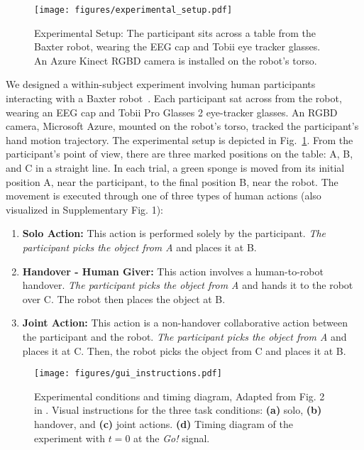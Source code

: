 \begin{figure}[t]
    \centering
    \texttt{[image: figures/experimental\_setup.pdf]}
    \caption{\justifying Experimental Setup: The participant sits across a table from the Baxter robot, wearing the EEG cap and Tobii eye tracker glasses. An Azure Kinect RGBD camera is installed on the robot's torso.}
    \label{fig:experimental setup}
\end{figure}

We designed a within-subject experiment involving human participants interacting with a Baxter robot~\cite{baxter-Doe:2024:Online}. Each participant sat across from the robot, wearing an EEG cap and Tobii Pro Glasses 2 eye-tracker glasses. An RGBD camera, Microsoft Azure,  mounted on the robot's torso, tracked the participant's hand motion trajectory. The experimental setup is depicted in Fig.~\ref{fig:experimental setup}. From the participant's point of view, there are three marked positions on the table: A, B, and C in a straight line. In each trial, a green sponge is moved from its initial position A, near the participant, to the final position B, near the robot. The movement is executed through one of three types of human actions (also visualized in Supplementary Fig. 1):
\begin{enumerate}[label=(\alph*)]
    \item \textbf{Solo Action:} This action is performed solely by the participant. \textit{The participant picks the object from A} and places it at B.
    \item \textbf{Handover - Human Giver:} This action involves a human-to-robot handover. \textit{The participant picks the object from A} and hands it to the robot over C. The robot then places the object at B. 
    \item \textbf{Joint Action:} This action is a non-handover collaborative action between the participant and the robot. \textit{The participant picks the object from A} and places it at C. Then, the robot picks the object from C and places it at B. 
\end{enumerate}
\begin{figure}[h]
    \centering
    \texttt{[image: figures/gui\_instructions.pdf]}
    \caption{Experimental conditions and timing diagram, Adapted from Fig. 2 in \cite{nonaEEG}. Visual instructions for the three task conditions: \textbf{(a)} solo, \textbf{(b)} handover, and \textbf{(c)} joint actions. \textbf{(d)} Timing diagram of the experiment with $t=0$ at the \emph{Go!} signal.}
    \label{fig:gui-ins}
\end{figure}


